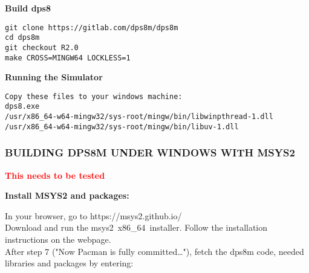\textbf{Build dps8}

\begin{adjustwidth}{5ex}{1ex}
    \texttt{git clone https://gitlab.com/dps8m/dps8m} \\
    \texttt{cd dps8m} \\
    \texttt{git checkout R2.0} \\
    \texttt{make CROSS=MINGW64 LOCKLESS=1} \\
\end{adjustwidth}  

\textbf{Running the Simulator}

\begin{adjustwidth}{5ex}{1ex}
    \texttt{Copy these files to your windows machine:} \\
    \texttt{dps8.exe} \\
    \texttt{/usr/x86\_64-w64-mingw32/sys-root/mingw/bin/libwinpthread-1.dll} \\
    \texttt{/usr/x86\_64-w64-mingw32/sys-root/mingw/bin/libuv-1.dll} \\
\end{adjustwidth}  

\newpage

\subsubsection[Building dps8m under Windows with MSYS2]{BUILDING DPS8M UNDER WINDOWS WITH MSYS2}

\textbf{\textcolor{red}{This needs to be tested}}

\textbf{Install MSYS2 and packages:}

In your browser, go to https://msys2.github.io/ \\

Download and run the msys2\ x86\_64\ installer. Follow the installation
instructions on the webpage. \\

After step 7 ("Now Pacman is fully committed…"), fetch the dps8m
code, needed libraries and packages by entering: \\


